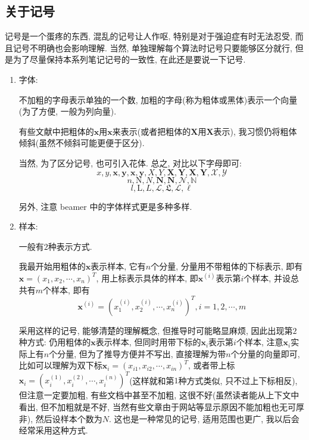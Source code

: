 \documentclass[a4paper,UTF8]{ctexart}
\theoremstyle{plain} \newtheorem{theorem}{定理}[section]
\theoremstyle{plain} \newtheorem{definition}{定义}[section]
\theoremstyle{plain} \newtheorem{lemma}{引理}[section]
\theoremstyle{plain} \newtheorem{proposition}{命题}[section]
\theoremstyle{plain} \newtheorem{example}{例}[section]
\theoremstyle{plain} \newtheorem{remark}{注}[section]
\theoremstyle{plain} \newtheorem{corollary}{推论}[section]
\begin{document}
\subsection{关于记号}
记号是一个蛋疼的东西, 混乱的记号让人作呕, 特别是对于强迫症有时无法忍受, 而且记号不明确也会影响理解. 当然, 单独理解每个算法时记号只要能够区分就行, 但是为了尽量保持本系列笔记记号的一致性, 在此还是要说一下记号.
\begin{enumerate}[(1)]
\item 字体:

不加粗的字母表示单独的一个数, 加粗的字母(称为粗体或黑体)表示一个向量(为了方便, 一般为列向量).

有些文献中把粗体的$\bm{x}$用$\mathbf{x}$来表示(或者把粗体的$\bm{X}$用$\mathbf{X}$表示), 我习惯仍将粗体倾斜(虽然不倾斜可能更便于区分).

当然, 为了区分记号, 也可引入花体. 总之, 对比以下字母即可:
\[
x, y, \bm{x}, \bm{y}, \mathbf{x}, \mathbf{y}, X, Y, \bm{X}, \bm{Y},
\mathbf{X}, \mathbf{Y}, \mathcal{X}, \mathcal{Y}
\]
\[
n, \mathrm{N}, N, \bm{N}, \mathbf{N}, \mathcal{N}, \mathbb{N}
\]
\[
l, \mathrm{L}, L, \mathcal{L}, \mathfrak{L}, \mathscr{L}, \ell
\]

另外, 注意 beamer 中的字体样式更是多种多样.

\item 样本:

一般有$2$种表示方式.

我最开始用粗体的$\bm{x}$表示样本, 它有$n$个分量, 分量用不带粗体的下标表示, 即有$\bm{x} = (x_{1}, x_{2}, \cdots, x_{n})^{T}$, 用上标表示具体的样本, 即$\bm{x}^{(i)}$表示第$i$个样本, 并设总共有$m$个样本, 即有
\begin{equation*}
\bm{x}^{(i)} = (x_{1}^{(i)}, x_{2}^{(i)}, \cdots, x_{n}^{(i)})^{T},i = 1, 2, \cdots, m
\end{equation*}

采用这样的记号, 能够清楚的理解概念, 但推导时可能略显麻烦, 因此出现第$2$种方式: 仍用粗体的$\bm{x}$表示样本, 但同时用带下标的$\bm{x}_{i}$表示第$i$个样本,  注意$\bm{x}_{i}$实际上有$n$个分量, 但为了推导方便并不写出, 直接理解为带$n$个分量的向量即可, 比如可以理解为双下标$\bm{x}_{i} = (x_{i1}, x_{i2}, \cdots, x_{in})^{T}$, 或者带上标$\bm{x}_{i} = (x_{i}^{(1)}, x_{i}^{(2)}, \cdots, x_{i}^{(n)})^{T}$(这样就和第$1$种方式类似, 只不过上下标相反), 但注意一定要加粗, 有些文档中甚至不加粗, 这很不好(虽然读者能从上下文中看出, 但不加粗就是不好, 当然有些文章由于网站等显示原因不能加粗也无可厚非), 然后设样本个数为$N$. 这也是一种常见的记号, 适用范围也更广, 我以后会经常采用这种方式.


\end{enumerate}
\end{document}
